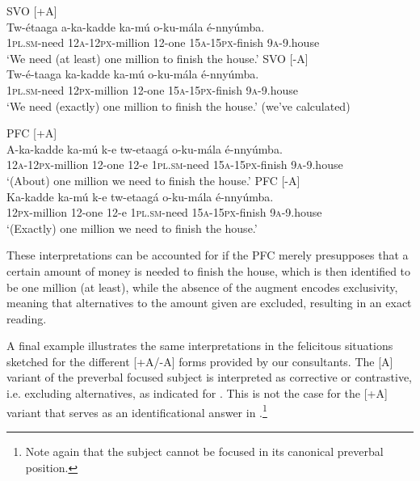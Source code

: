 \documentclass[output=paper]{langsci/langscibook}
\begin{document}
\ea\label{ex:vanderwal:40}
\ea\label{ex:vanderwal:40a}    {SVO [+A]}\\
\gll   Tw-étaaga  a-ka-kadde    ka-mú  o-ku-mála    é-nnyúmba.\\
       \textsc{1pl}.\textsc{sm}-need  \textsc{12a}-\textsc{12px}-million  12-one  \textsc{15a}-\textsc{15px}-finish  \textsc{9a}-9.house\\
\glt   ‘We need (at least) one million to finish the house.’
\ex \label{ex:vanderwal:40b}
 SVO [-A]\\
\gll Tw-é-taaga  ka-kadde  ka-mú  o-ku-mála    é-nnyúmba.\\
     \textsc{1pl}.\textsc{sm}-need  \textsc{12px}-million  12-one  \textsc{15a}-\textsc{15px}-finish  \textsc{9a}-9.house\\
\glt ‘We need (exactly) one million to finish the house.’ (we’ve calculated)
\z
\z

\ea\label{ex:vanderwal:41}
\ea\label{ex:vanderwal:41a}PFC [+A]\\
\gll A-ka-kadde  ka-mú  k-e  tw-etaagá  o-ku-mála    é-nnyúmba.\\
     \textsc{12a}-\textsc{12px}-million  12-one  12-e  \textsc{1pl}.\textsc{sm}-need  \textsc{15a}-\textsc{15px}-finish  \textsc{9a}-9.house\\
\glt ‘(About) one million we need to finish the house.’
\ex \label{ex:vanderwal:41b}
  PFC [-A]\\
\gll Ka-kadde    ka-mú  k-e  tw-etaagá  o-ku-mála    é-nnyúmba.\\
     \textsc{12px}-million  12-one  12-e  \textsc{1pl}.\textsc{sm}-need  \textsc{15a}-\textsc{15px}-finish  \textsc{9a}-9.house\\
\glt ‘(Exactly) one million we need to finish the house.’
\z
\z

These interpretations can be accounted for if the PFC merely presupposes that a certain amount of money is needed to finish the house, which is then identified to be one million (at least), while the absence of the augment encodes exclusivity, meaning that alternatives to the amount given are excluded, resulting in an exact reading.

A final example illustrates the same interpretations in the felicitous situations sketched for the different [+A/-A] forms provided by our consultants. The [A] variant of the preverbal focused subject is interpreted as corrective or contrastive, i.e. excluding alternatives, as indicated for . This is not the case for the [+A] variant that serves as an identificational answer in .\footnote{Note again that the subject cannot be focused in its canonical preverbal position.}
\end{document}
